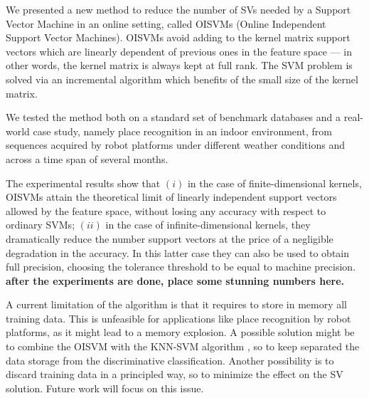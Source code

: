 We presented a new method to reduce the number of SVs needed by a
Support Vector Machine in an online setting, called OISVMs (Online
Independent Support Vector Machines). OISVMs avoid adding to the
kernel matrix support vectors which are linearly dependent of previous
ones in the feature space --- in other words, the kernel matrix is
always kept at full rank. The SVM problem is solved via an incremental
algorithm which benefits of the small size of the kernel matrix.

We tested the method both on a standard set of benchmark databases and
a real-world case study, namely place recognition in an indoor
environment, from sequences acquired by robot platforms under
different weather conditions and across a time span of several months.

The experimental results show that $(i)$ in the case of
finite-dimensional kernels, OISVMs attain the theoretical limit of
linearly independent support vectors allowed by the feature space,
without losing any accuracy with respect to ordinary SVMs; $(ii)$ in
the case of infinite-dimensional kernels, they dramatically reduce the
number support vectors at the price of a negligible degradation in the
accuracy. In this latter case they can also be used to obtain full
precision, choosing the tolerance threshold to be equal to machine
precision.  {\bf after the experiments are done, place some stunning
numbers here.}

A current limitation of the algorithm is that it requires to store in
memory all training data. This is unfeasible for applications like
place recognition by robot platforms, as it might lead to a memory
explosion. A possible solution might be to combine the OISVM with the
KNN-SVM algorithm \cite{zhang:cvpr06}, so to keep separated the data
storage from the discriminative classification. Another possibility is
to discard training data in a principled way, so to minimize the
effect on the SV solution. Future work will focus on this issue.
